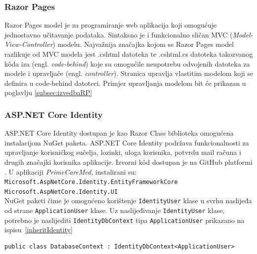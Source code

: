 \subsubsection{Razor Pages}
Razor Pages model je za programiranje web aplikacija koji omogućuje jednostavno učitavanje podataka. Sintaksno je i funkcionalno sličan MVC (\textit{Model-View-Controller}) modelu. Najvažnija značajka kojom se Razor Pages model razlikuje od MVC modela jest .cshtml datoteka te .cshtml.cs datoteka takozvanog k\^oda iza (engl. \textit{code-behind}) koje su omogućile neupotrebu odvojenih datoteka za modele i upravljače (engl. \textit{controller}). Stranica upravlja vlastitim modelom koji se definira u code-behind datoteci. Primjer upravljanja modelom bit će prikazan u poglavlju \ref{subsec:izvedbaRP} 

\subsubsection{ASP.NET Core Identity}
\label{subsubsec:IdentityCore}
 
ASP.NET Core Identity dostupan je kao Razor Class biblioteka omogućena instalacijom NuGet paketa.  ASP.NET Core Identity podržava funkcionalnosti za upravljanje korisničkog sučelja, lozinki, uloga korisnika, potvrdu mail računa i drugih značajki korisnika aplikacije. Izvorni k\^od dostupan je na GitHub platformi \cite{aspNETGitHub}. U aplikaciji \textit{PrimeCareMed}, instalirani su: \\ \texttt{Microsoft.AspNetCore.Identity.EntityFrameworkCore} \\ \texttt{Microsoft.AspNetCore.Identity.UI}  \\ NuGet paketi čime je omogućeno korištenje \texttt{IdentityUser} klase u svrhu naslijeđa od strane \texttt{ApplicationUser} klase. Uz naslijeđivanje \texttt{IdentityUser} klase, potrebno je naslijediti \texttt{IdentityDbContext} tipa \texttt{ApplicationUser} prikazano na ispisu~\ref{inheritIdentity}
\begin{lstlisting}[caption={Naslijeđivanje \texttt{IdentityDbContext} klase}, label=inheritIdentity]
public class DatabaseContext : IdentityDbContext<ApplicationUser>
\end{lstlisting}

